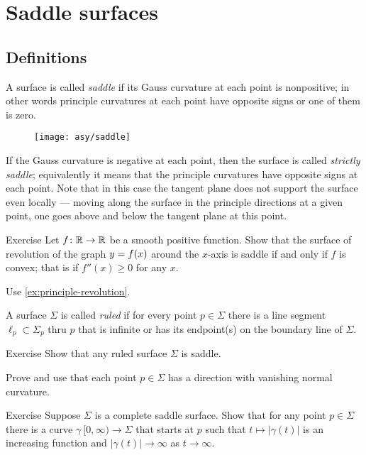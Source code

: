 \chapter{Saddle surfaces}

\section*{Definitions}

A surface is called \emph{saddle} if its Gauss curvature at each point is nonpositive;
in other words principle curvatures at each point have opposite signs or one of them is zero.

\begin{wrapfigure}{r}{40 mm}
\vskip-0mm
\centering
\texttt{[image: asy/saddle]}
\vskip0mm
\end{wrapfigure}

If the Gauss curvature is negative at each point,
then the surface is called \emph{strictly saddle};
equivalently it means that the principle curvatures have opposite signs at each point.
Note that in this case the tangent plane does not support the surface even locally --- moving along the surface in the principle directions at a given point, one goes above and below the tangent plane at this point.  


\begin{thm}{Exercise}\label{ex:convex-revolution}
Let $f\colon\mathbb{R}\to\mathbb{R}$ be a smooth positive function.
Show that the surface of revolution of the graph $y\z=f(x)$ around the $x$-axis
 is saddle if and only if $f$ is convex; that is if $f''(x)\ge0$ for any $x$.
\end{thm}

 Use \ref{ex:principle-revolution}.

A surface $\Sigma$ is called \emph{ruled} if for every point $p\in \Sigma$ there is a line segment $\ell_p\subset \Sigma_p$ thru $p$ that is infinite or has its endpoint(s) on the boundary line of $\Sigma$.

\begin{thm}{Exercise}
Show that any ruled surface $\Sigma$ is saddle.
\end{thm}

 Prove and use that each point $p\in\Sigma$ has a direction with vanishing normal curvature.

\begin{thm}{Exercise}
Suppose $\Sigma$ is a complete saddle surface.
Show that for any point $p\in \Sigma$ there is a curve $\gamma\:[0,\infty)\to\Sigma$ that starts at $p$
such that $t\mapsto|\gamma(t)|$ is an increasing function and $|\gamma(t)|\to\infty$ as $t\to\infty$.
\end{thm}

